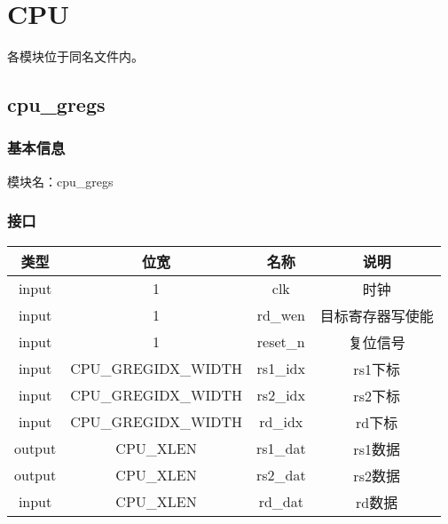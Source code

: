 %
%
%
%
%
%
%
%

\chapter{CPU}
各模块位于同名文件内。

\section{cpu\_gregs}
\subsection{基本信息}
模块名：cpu\_gregs
\subsection{接口}
\begin{tabular}{|c|c|c|c|}
    \hline
    类型    &   位宽    &   名称    &   说明\\\hline
    input   &   1   &   clk &   时钟\\\hline
    input   &   1   &   rd\_wen  &   目标寄存器写使能\\\hline
    input   &   1   &   reset\_n  &   复位信号\\\hline
    input   &   CPU\_GREGIDX\_WIDTH &   rs1\_idx    &   rs1下标\\\hline
    input   &   CPU\_GREGIDX\_WIDTH &   rs2\_idx    &   rs2下标\\\hline
    input   &   CPU\_GREGIDX\_WIDTH &   rd\_idx    &   rd下标\\\hline
    output   &   CPU\_XLEN &   rs1\_dat    &   rs1数据\\\hline
    output   &   CPU\_XLEN &   rs2\_dat    &   rs2数据\\\hline
    input   &   CPU\_XLEN &   rd\_dat    &   rd数据\\\hline
\end{tabular}
